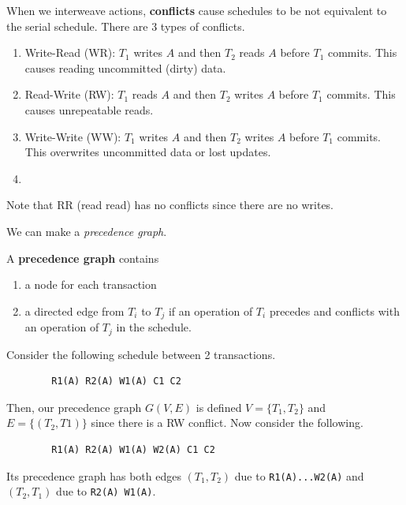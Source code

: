 \documentclass{article}
\begin{document}
    \begin{definition}[Conflict]
      When we interweave actions, \textbf{conflicts} cause schedules to be not equivalent to the serial schedule. There are 3 types of conflicts. 
      \begin{enumerate}
        \item Write-Read (WR): $T_1$ writes $A$ and then $T_2$ reads $A$ before $T_1$ commits. This causes reading uncommitted (dirty) data. 
        \item Read-Write (RW): $T_1$ reads $A$ and then $T_2$ writes $A$ before $T_1$ commits. This causes unrepeatable reads. 
        \item Write-Write (WW): $T_1$ writes $A$ and then $T_2$ writes $A$ before $T_1$ commits. This overwrites uncommitted data or lost updates. 
        \item 
      \end{enumerate}
      Note that RR (read read) has no conflicts since there are no writes. 
    \end{definition}

    We can make a \textit{precedence graph}. 

    \begin{definition}
      A \textbf{precedence graph} contains 
      \begin{enumerate}
        \item a node for each transaction 
        \item a directed edge from $T_i$ to $T_j$ if an operation of $T_i$ precedes and conflicts with an operation of $T_j$ in the schedule. 
      \end{enumerate}
    \end{definition} 

    \begin{example}
      Consider the following schedule between 2 transactions. 
      \begin{lstlisting}
        R1(A) R2(A) W1(A) C1 C2
      \end{lstlisting}
      Then, our precedence graph $G(V, E)$ is defined $V = \{T_1, T_2\}$ and $E = \{(T_2, T1)\}$ since there is a RW conflict. Now consider the following. 
      \begin{lstlisting}
        R1(A) R2(A) W1(A) W2(A) C1 C2
      \end{lstlisting}
      Its precedence graph has both edges $(T_1, T_2)$ due to \texttt{R1(A)...W2(A)} and $(T_2, T_1)$ due to \texttt{R2(A) W1(A)}. 
    \end{example}
\end{document}
